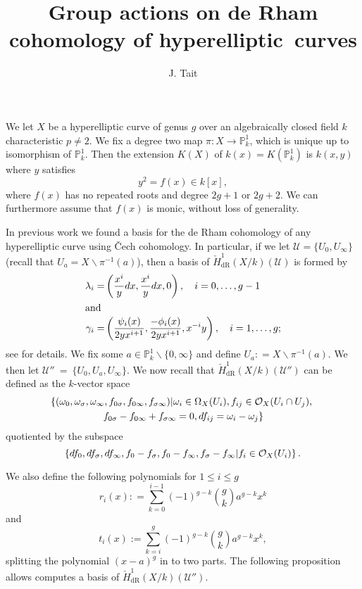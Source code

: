 \documentclass[draft, 11pt]{article} %
\title{Group actions on de Rham cohomology of hyperelliptic~curves}
\author{J. Tait}
\theoremstyle{plain}
\theoremstyle{remark}
\newcommand{\cO}{{\cal O}}
\newcommand{\ra}{\rightarrow}
\newcommand{\cU}{{\mathcal U}}
\newcommand{\cech}{\v{C}ech }
\newcommand{\cechderhamhone}{\check{H}_{\text {dR}}^1(X/k)}
\begin{document}
\maketitle
\listoftodos
\bigskip


We let $X$ be a hyperelliptic curve of genus $g$ over an algebraically closed field $k$ characteristic $p \neq 2$.
We fix a degree two map $\pi \colon X \ra \mathbb{P}^1_k$, which is unique up to isomorphism of $\mathbb{P}_k^1$.
Then the extension $K(X)$ of $k(x) = K(\mathbb{P}_k^1)$ is $k(x,y)$ where $y$ satisfies
\begin{equation}\label{definingequation}
y^2 = f(x) \in k[x],
\end{equation}
where $f(x)$ has no repeated roots and degree $2g+1$ or $2g+2$.
We can furthermore assume that $f(x)$ is monic, without loss of generality.


In previous work we found a basis for the de Rham cohomology of any hyperelliptic curve using \cech cohomology.
In particular,  if we let $\cU = \{ U_0 , U_\infty\}$ (recall that $U_a = X\backslash \pi^{-1}(a)$), then a basis of $\cechderhamhone(\cU)$ is formed by
\begin{align*}
\lambda_i  = & \left( \frac{x^i}{y}dx, \frac{x^i}{y}dx, 0\right) ,\quad i=0, \ldots, g-1 \\
\intertext{and}
\gamma_i = & \left ( \frac{\psi_i(x)}{2yx^{i+1}}, \frac{-\phi_i(x)}{2yx^{i+1}}, x^{-i}y \right), \quad i=1,\ldots ,g;
\end{align*}
see \cite{derhamactions} for details.
We fix some $a \in \mathbb P_k^1\backslash \{0, \infty\}$ and define $U_a : = X \backslash \pi^{-1}(a)$.
We then let $\cU''~=~\{U_0,U_a, U_\infty\}$.
We now recall that $\cechderhamhone(\cU'')$ can be defined as the $k$-vector space 
\begin{multline}\label{sixtupleconditions}
\left\{ (\omega_0, \omega_\sigma, \omega_\infty , f_{0\sigma}, f_{0 \infty},f_{\sigma \infty}) | \omega_i \in \Omega_X(U_i), f_{ij} \in \cO_X(U_i \cap U_j), \right. \\ \left. f_{0\sigma} - f_{0\infty} + f_{\sigma \infty} = 0, df_{ij} = \omega_i - \omega_j \right\}
\end{multline}
quotiented by the subspace 
\[
\left\{ df_0, df_\sigma, df_\infty, f_0- f_\sigma, f_0 - f_\infty, f_\sigma - f_\infty | f_i \in \cO_X(U_i)\right\}.
\]

We also define the following polynomials for $1 \leq i \leq g$
\[
r_i(x) : = \sum_{k=0}^{i-1} (-1)^{g-k}\binom{g}{k} a^{g-k} x^k
\]
and
\[
t_i(x) := \sum_{k=i}^{g} (-1)^{g-k}\binom{g}{k} a^{g-k} x^k,
\]
splitting the polynomial $(x-a)^g$ in to two parts.
The following proposition allows computes a basis of $\cechderhamhone(\cU'')$.
\end{document}
